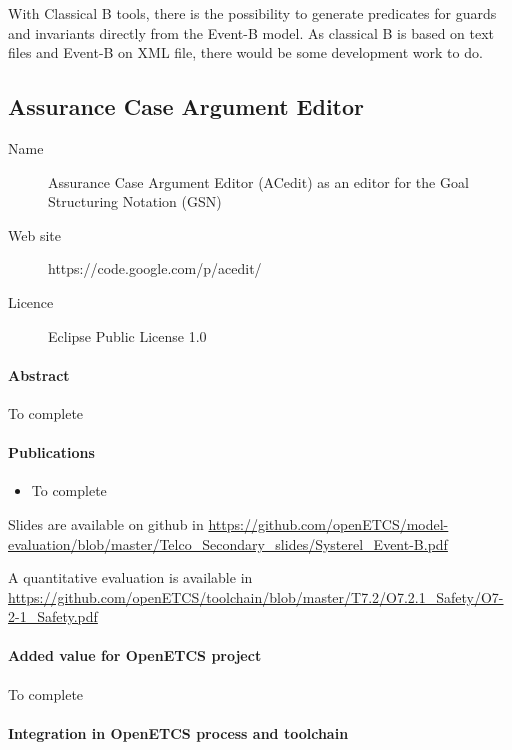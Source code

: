   With Classical B tools, there is the possibility to generate predicates for
  guards and invariants directly from the Event-B model. As classical B is based
  on text files and Event-B on XML file, there would be some development work to
  do.

\subsection{Assurance Case Argument Editor}

\begin{description}
\item[Name] Assurance Case Argument Editor (ACedit) as an editor for the Goal Structuring Notation (GSN)
\item[Web site] https://code.google.com/p/acedit/
\item[Licence] Eclipse Public License 1.0
\end{description}

\paragraph{Abstract}

To complete

\paragraph{Publications}

\begin{itemize}
\item To complete
\end{itemize}

Slides are available on github in 
\url{https://github.com/openETCS/model-evaluation/blob/master/Telco_Secondary_slides/Systerel_Event-B.pdf}

A quantitative evaluation is available in 
\url{https://github.com/openETCS/toolchain/blob/master/T7.2/O7.2.1_Safety/O7-2-1_Safety.pdf}

\paragraph{Added value for OpenETCS project}

To complete

\paragraph{Integration in OpenETCS process and toolchain}

